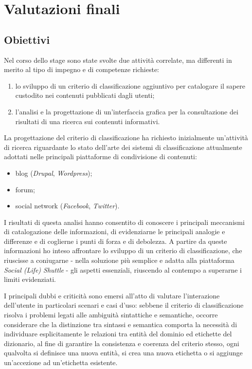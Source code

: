 \chapter{Valutazioni finali}
\label{ch:tesi:conclusioni}

\section{Obiettivi}
Nel corso dello stage sono state svolte due attività correlate, ma differenti in merito al tipo di impegno e di competenze richieste:
\begin{enumerate}
  \item lo sviluppo di un criterio di classificazione aggiuntivo per catalogare il sapere custodito nei contenuti pubblicati dagli utenti;
  \item l'analisi e la progettazione di un'interfaccia grafica per la consultazione dei risultati di una ricerca sui contenuti informativi.
\end{enumerate}

La progettazione del criterio di classificazione ha richiesto inizialmente un'attività di ricerca riguardante lo stato dell'arte dei sistemi di classificazione attualmente adottati nelle principali piattaforme di condivisione di contenuti:
\begin{itemize}
  \item blog (\textit{Drupal}, \textit{Wordpress});
  \item forum;
  \item social network (\textit{Facebook}, \textit{Twitter}).
\end{itemize}

I risultati di questa analisi hanno consentito di conoscere i principali meccanismi di catalogazione delle informazioni, di evidenziarne le principali analogie e differenze e di coglierne i punti di forza e di debolezza. A partire da queste informazioni ho inteso affrontare lo sviluppo di un criterio di classificazione, che riuscisse a coniugarne - nella soluzione più semplice e adatta alla piattaforma \textit{Social (Life) Shuttle} - gli aspetti essenziali, riuscendo al contempo a superarne i limiti evidenziati.

I principali dubbi e criticità sono emersi all'atto di valutare l'interazione dell'utente in particolari scenari e casi d'uso: sebbene il criterio di classificazione risolva i problemi legati alle ambiguità sintattiche e semantiche, occorre considerare che la distinzione tra sintassi e semantica comporta la necessità di individuare esplicitamente le relazioni tra entità del dominio ed etichette del dizionario, al fine di garantire la consistenza e coerenza del criterio stesso, ogni qualvolta si definisce una nuova entità, si crea una nuova etichetta o si aggiunge un'accezione ad un'etichetta esistente.

